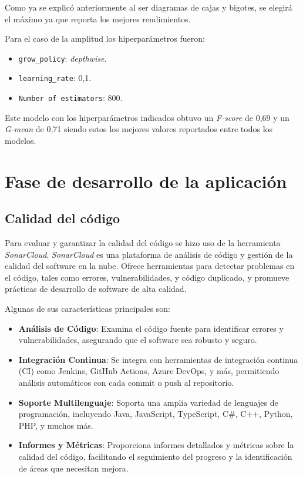 Como ya se explicó anteriormente al ser diagramas de cajas y bigotes, se elegirá el máximo ya que reporta los mejores rendimientos.

Para el caso de la amplitud los hiperparámetros fueron:
\begin{itemize}
\item \texttt{grow\_policy}: \textit{depthwise}.
\item \texttt{learning\_rate}: 0,1.
\item \texttt{Number of estimators}: 800.
\end{itemize}
Este modelo con los hiperparámetros indicados obtuvo un \textit{F-score} de 0,69 y un \textit{G-mean} de 0,71 siendo estos los mejores valores reportados entre todos los modelos.

\section{Fase de desarrollo de la aplicación}
\label{Fase de desarrollo de la aplicación}
\subsection{Calidad del código}
Para evaluar y garantizar la calidad del código se hizo uso de la herramienta \textit{SonarCloud}. \textit{SonarCloud} es una plataforma de análisis de código y gestión de la calidad del software en la nube. Ofrece herramientas para detectar problemas en el código, tales como errores, vulnerabilidades, y código duplicado, y promueve prácticas de desarrollo de software de alta calidad.

Algunas de sus características principales son:
\begin{itemize}

\item \textbf{Análisis de Código}: Examina el código fuente para identificar errores y vulnerabilidades, asegurando que el software sea robusto y seguro.

\item \textbf{Integración Continua}: Se integra con herramientas de integración continua (CI) como Jenkins, GitHub Actions, Azure DevOps, y más, permitiendo análisis automáticos con cada commit o push al repositorio.

\item \textbf{Soporte Multilenguaje}: Soporta una amplia variedad de lenguajes de programación, incluyendo Java, JavaScript, TypeScript, C\#, C++, Python, PHP, y muchos más.

\item \textbf{Informes y Métricas}: Proporciona informes detallados y métricas sobre la calidad del código, facilitando el seguimiento del progreso y la identificación de áreas que necesitan mejora.
\end{itemize}

